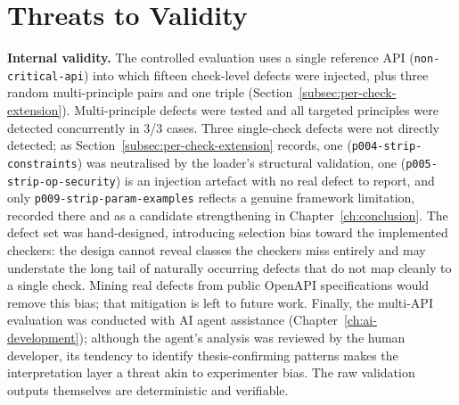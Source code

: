 \section{Threats to Validity}
\label{sec:threats}

\textbf{Internal validity.} The controlled evaluation uses a single reference API (\texttt{non-critical-api}) into which fifteen check-level defects were injected, plus three random multi-principle pairs and one triple (Section~\ref{subsec:per-check-extension}). Multi-principle defects were tested and all targeted principles were detected concurrently in 3/3 cases. Three single-check defects were not directly detected; as Section~\ref{subsec:per-check-extension} records, one (\texttt{p004-strip-constraints}) was neutralised by the loader's structural validation, one (\texttt{p005-strip-op-security}) is an injection artefact with no real defect to report, and only \texttt{p009-strip-param-examples} reflects a genuine framework limitation, recorded there and as a candidate strengthening in Chapter~\ref{ch:conclusion}. The defect set was hand-designed, introducing selection bias toward the implemented checkers: the design cannot reveal classes the checkers miss entirely and may understate the long tail of naturally occurring defects that do not map cleanly to a single check. Mining real defects from public OpenAPI specifications would remove this bias; that mitigation is left to future work. Finally, the multi-API evaluation was conducted with AI agent assistance (Chapter~\ref{ch:ai-development}); although the agent's analysis was reviewed by the human developer, its tendency to identify thesis-confirming patterns makes the interpretation layer a threat akin to experimenter bias. The raw validation outputs themselves are deterministic and verifiable.

